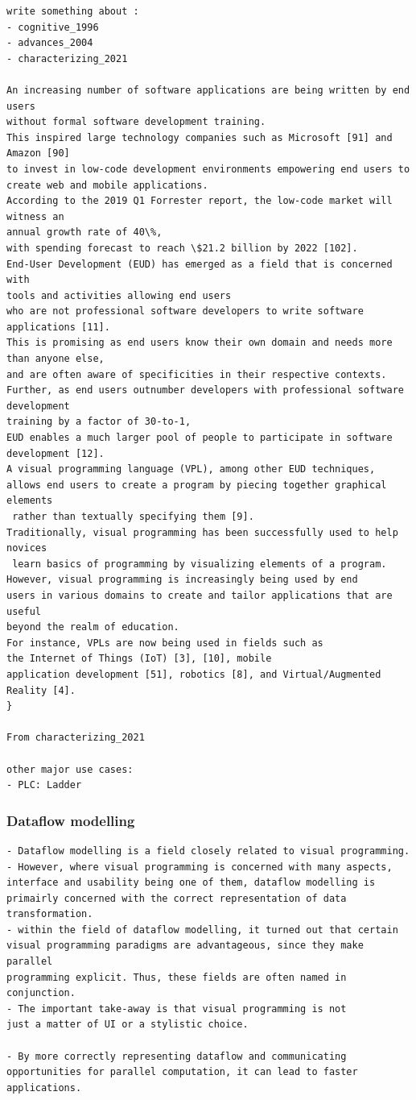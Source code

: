 \begin{lstlisting} 
write something about : 
- cognitive_1996 
- advances_2004
- characterizing_2021

An increasing number of software applications are being written by end users 
without formal software development training. 
This inspired large technology companies such as Microsoft [91] and Amazon [90] 
to invest in low-code development environments empowering end users to 
create web and mobile applications. 
According to the 2019 Q1 Forrester report, the low-code market will witness an 
annual growth rate of 40\%, 
with spending forecast to reach \$21.2 billion by 2022 [102]. 
End-User Development (EUD) has emerged as a field that is concerned with 
tools and activities allowing end users 
who are not professional software developers to write software applications [11]. 
This is promising as end users know their own domain and needs more than anyone else, 
and are often aware of specificities in their respective contexts. 
Further, as end users outnumber developers with professional software development 
training by a factor of 30-to-1, 
EUD enables a much larger pool of people to participate in software development [12]. 
A visual programming language (VPL), among other EUD techniques, 
allows end users to create a program by piecing together graphical elements
 rather than textually specifying them [9]. 
Traditionally, visual programming has been successfully used to help novices
 learn basics of programming by visualizing elements of a program. 
However, visual programming is increasingly being used by end 
users in various domains to create and tailor applications that are useful 
beyond the realm of education. 
For instance, VPLs are now being used in fields such as 
the Internet of Things (IoT) [3], [10], mobile 
application development [51], robotics [8], and Virtual/Augmented Reality [4].
}

From characterizing_2021

other major use cases: 
- PLC: Ladder

\end{lstlisting}

\subsubsection*{Dataflow modelling}

\begin{lstlisting}
- Dataflow modelling is a field closely related to visual programming.
- However, where visual programming is concerned with many aspects, 
interface and usability being one of them, dataflow modelling is 
primairly concerned with the correct representation of data transformation.   
- within the field of dataflow modelling, it turned out that certain 
visual programming paradigms are advantageous, since they make parallel 
programming explicit. Thus, these fields are often named in conjunction. 
- The important take-away is that visual programming is not 
just a matter of UI or a stylistic choice.

- By more correctly representing dataflow and communicating 
opportunities for parallel computation, it can lead to faster applications.
\end{lstlisting}

